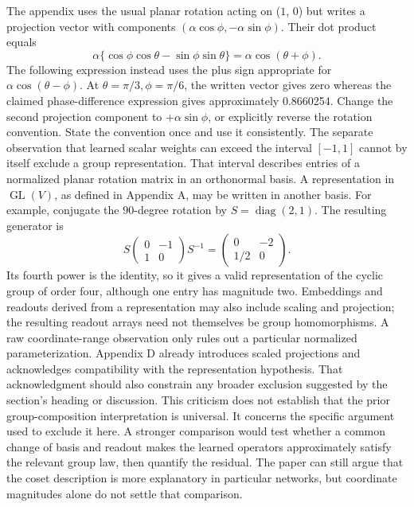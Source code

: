 \documentclass[11pt]{article}
\begin{document}
The appendix uses the usual planar rotation acting on (\(1\), \(0\)) but writes a projection vector with components \((\alpha\cos\phi,-\alpha\sin\phi)\). Their dot product equals \[
\alpha\{\cos\phi\cos\theta-\sin\phi\sin\theta\}
=\alpha\cos(\theta+\phi).
\] The following expression instead uses the plus sign appropriate for \(\alpha\cos(\theta-\phi)\). At \(\theta=\pi/3,\phi=\pi/6\), the written vector gives zero whereas the claimed phase-difference expression gives approximately 0.8660254. Change the second projection component to \(+\alpha\sin\phi\), or explicitly reverse the rotation convention. State the convention once and use it consistently. The separate observation that learned scalar weights can exceed the interval \([-1,1]\) cannot by itself exclude a group representation. That interval describes entries of a normalized planar rotation matrix in an orthonormal basis. A representation in \(\operatorname{GL}(V)\), as defined in Appendix A, may be written in another basis. For example, conjugate the \(90\)-degree rotation by \(S=\operatorname{diag}(2,1)\). The resulting generator is \[
S\begin{pmatrix}0&-1\\1&0\end{pmatrix}S^{-1}
=\begin{pmatrix}0&-2\\1/2&0\end{pmatrix}.
\] Its fourth power is the identity, so it gives a valid representation of the cyclic group of order four, although one entry has magnitude two. Embeddings and readouts derived from a representation may also include scaling and projection; the resulting readout arrays need not themselves be group homomorphisms. A raw coordinate-range observation only rules out a particular normalized parameterization. Appendix D already introduces scaled projections and acknowledges compatibility with the representation hypothesis. That acknowledgment should also constrain any broader exclusion suggested by the section's heading or discussion. This criticism does not establish that the prior group-composition interpretation is universal. It concerns the specific argument used to exclude it here. A stronger comparison would test whether a common change of basis and readout makes the learned operators approximately satisfy the relevant group law, then quantify the residual. The paper can still argue that the coset description is more explanatory in particular networks, but coordinate magnitudes alone do not settle that comparison.
\end{document}
